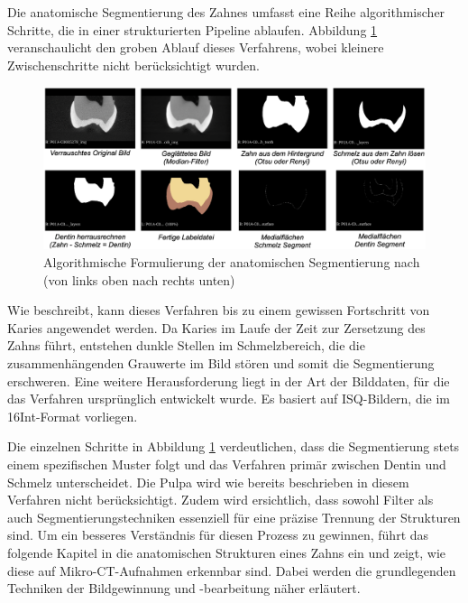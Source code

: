 Die anatomische Segmentierung des Zahnes umfasst eine Reihe algorithmischer
Schritte, die in einer strukturierten Pipeline ablaufen. Abbildung
\ref{fig:anatomische_segmentierung} veranschaulicht den groben Ablauf dieses
Verfahrens, wobei kleinere Zwischenschritte nicht berücksichtigt wurden.

\begin{figure}[h]
	\centering
	\includegraphics[width=1\textwidth]{img/anatomischeSegmentierung.png}
	\caption{Algorithmische Formulierung der anatomischen Segmentierung nach
	\citet{hoffmann2020} (von links oben nach rechts unten)}
	\label{fig:anatomische_segmentierung}
\end{figure}

Wie \citet[S.~55]{hoffmann2020} beschreibt, kann dieses Verfahren bis zu einem
gewissen Fortschritt von Karies angewendet werden. Da Karies im Laufe der Zeit zur
Zersetzung des Zahns führt, entstehen dunkle Stellen im Schmelzbereich, die die zusammenhängenden
Grauwerte im Bild stören und somit die Segmentierung erschweren. Eine weitere
Herausforderung liegt in der Art der Bilddaten, für die das Verfahren ursprünglich
entwickelt wurde. Es basiert auf \ac{ISQ}-Bildern, die im \ac{16Int}-Format vorliegen.

Die einzelnen Schritte in Abbildung \ref{fig:anatomische_segmentierung} verdeutlichen,
dass die Segmentierung stets einem spezifischen Muster folgt und das Verfahren
primär zwischen Dentin und Schmelz unterscheidet. Die Pulpa wird wie bereits beschrieben
in diesem Verfahren nicht berücksichtigt. Zudem wird ersichtlich, dass sowohl Filter
als auch Segmentierungstechniken essenziell für eine präzise Trennung der Strukturen
sind. Um ein besseres Verständnis für diesen Prozess zu gewinnen, führt das folgende
Kapitel in die anatomischen Strukturen eines Zahns ein und zeigt, wie diese auf
Mikro-\ac{CT}-Aufnahmen erkennbar sind. Dabei werden die grundlegenden Techniken
der Bildgewinnung und -bearbeitung näher erläutert.

